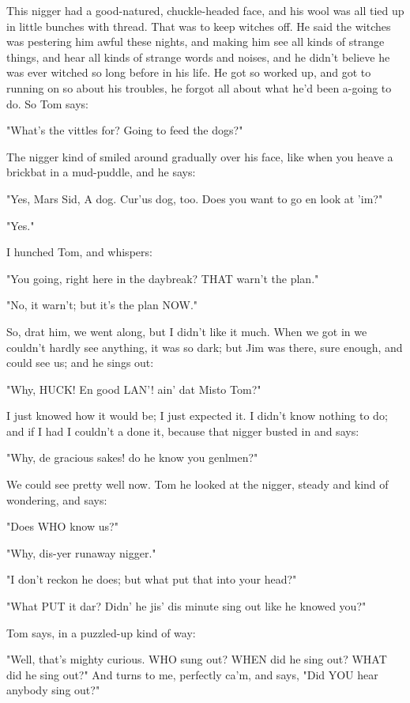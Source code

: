 This nigger had a good-natured, chuckle-headed face, and his wool was all
tied up in little bunches with thread.  That was to keep witches off.  He
said the witches was pestering him awful these nights, and making him see
all kinds of strange things, and hear all kinds of strange words and
noises, and he didn't believe he was ever witched so long before in his
life.  He got so worked up, and got to running on so about his troubles,
he forgot all about what he'd been a-going to do.  So Tom says:

"What's the vittles for?  Going to feed the dogs?"

The nigger kind of smiled around gradually over his face, like when you
heave a brickbat in a mud-puddle, and he says:

"Yes, Mars Sid, A dog.  Cur'us dog, too.  Does you want to go en look at
'im?"

"Yes."

I hunched Tom, and whispers:

"You going, right here in the daybreak?  THAT warn't the plan."

"No, it warn't; but it's the plan NOW."

So, drat him, we went along, but I didn't like it much.  When we got in
we couldn't hardly see anything, it was so dark; but Jim was there, sure
enough, and could see us; and he sings out:

"Why, HUCK!  En good LAN'! ain' dat Misto Tom?"

I just knowed how it would be; I just expected it.  I didn't know nothing
to do; and if I had I couldn't a done it, because that nigger busted in
and says:

"Why, de gracious sakes! do he know you genlmen?"

We could see pretty well now.  Tom he looked at the nigger, steady and
kind of wondering, and says:

"Does WHO know us?"

"Why, dis-yer runaway nigger."

"I don't reckon he does; but what put that into your head?"

"What PUT it dar?  Didn' he jis' dis minute sing out like he knowed you?"

Tom says, in a puzzled-up kind of way:

"Well, that's mighty curious.  WHO sung out? WHEN did he sing out?  WHAT
did he sing out?" And turns to me, perfectly ca'm, and says, "Did YOU
hear anybody sing out?"

